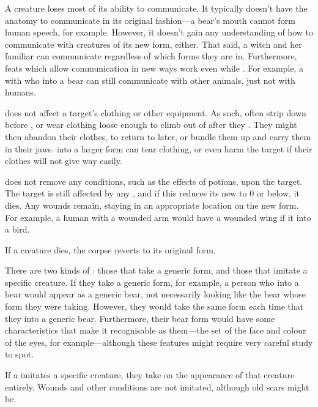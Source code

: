 A {\transformed} creature loses most of its ability to communicate.
It typically doesn't have the anatomy to communicate in its original fashion---a bear's mouth cannot form human speech, for example.
However, it doesn't gain any understanding of how to communicate with creatures of its new form, either.
That said, a witch and her familiar can communicate regardless of which forms they are in.
Furthermore, feats which allow communication in new ways work even while {\transformed}.
For example, a  with  who {\transforms} into a bear can still communicate with other animals, just not with humans.

\capital{\transformation} does not affect a target's clothing or other equipment.
As such,  often strip down before {\transforming}, or wear clothing loose enough to climb out of after they {\transform}.
They might then abandon their clothes, to return to later, or bundle them up and carry them in their jaws.
\capital{\transforming} into a larger form can tear clothing, or even harm the target if their clothes will not give way easily.

\capital{\transformation} does not remove any conditions, such as the effects of potions, upon the target.
The target is still affected by any {\damage}, and if this reduces its new  to 0 or below, it dies.
Any wounds remain, staying in an appropriate location on the new form.
For example, a human with a wounded arm would have a wounded wing if it {\transformed} into a bird.

If a {\transformed} creature dies, the corpse reverts to its original form.

There are two kinds of {\transformations}: those that take a generic form, and those that imitate a specific creature.
If they take a generic form, for example, a person who {\transforms} into a bear would appear as a generic bear, not necessarily looking like the bear whose form they were taking.
However, they would take the same form each time that they {\transform} into a generic bear.
Furthermore, their bear form would have some characteristics that make it recognisable as them---the set of the face and colour of the eyes, for example---although these features might require very careful study to spot.

If a {\transformation} imitates a specific creature, they take on the appearance of that creature entirely.
Wounds and other conditions are not imitated, although old scars might be.

